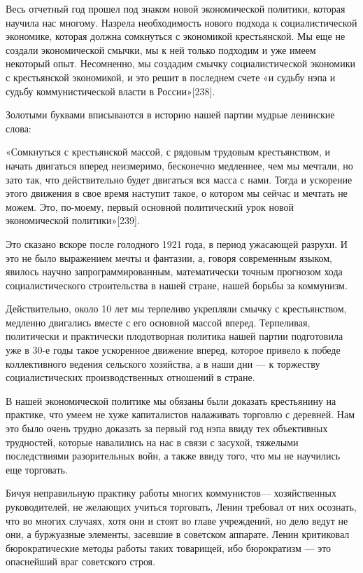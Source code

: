 \documentclass[12pt, a4paper, openany]{book}
\begin{document}
Весь отчетный год прошел под знаком новой экономической политики, которая научила нас многому. Назрела необходимость нового подхода к социалистической экономике, которая должна сомкнуться с экономикой крестьянской. Мы еще не создали экономической смычки, мы к ней только подходим и уже имеем некоторый опыт. Несомненно, мы создадим смычку социалистической экономики с крестьянской экономикой, и это решит в последнем счете «и судьбу нэпа и судьбу коммунистической власти в России»[238].

Золотыми буквами вписываются в историю нашей партии мудрые ленинские слова:

«Сомкнуться с крестьянской массой, с рядовым трудовым крестьянством, и начать двигаться вперед неизмеримо, бесконечно медленнее, чем мы мечтали, но зато так, что действительно будет двигаться вся масса с нами. Тогда и ускорение этого движения в свое время наступит такое, о котором мы сейчас и мечтать не можем. Это, по-моему, первый основной политический урок новой экономической политики»[239].

Это сказано вскоре после голодного 1921 года, в период ужасающей разрухи. И это не было выражением мечты и фантазии, а, говоря современным языком, явилось научно запрограммированным, математически точным прогнозом хода социалистического строительства в нашей стране, нашей борьбы за коммунизм.

Действительно, около 10 лет мы терпеливо укрепляли смычку с крестьянством, медленно двигались вместе с его основной массой вперед. Терпеливая, политически и практически плодотворная политика нашей партии подготовила уже в 30-е годы такое ускоренное движение вперед, которое привело к победе коллективного ведения сельского хозяйства, а в наши дни — к торжеству социалистических производственных отношений в стране.

В нашей экономической политике мы обязаны были доказать крестьянину на практике, что умеем не хуже капиталистов налаживать торговлю с деревней. Нам это было очень трудно доказать за первый год нэпа ввиду тех объективных трудностей, которые навалились на нас в связи с засухой, тяжелыми последствиями разорительных войн, а также ввиду того, что мы не научились еще торговать.

Бичуя неправильную практику работы многих коммунистов— хозяйственных руководителей, не желающих учиться торговать, Ленин требовал от них осознать, что во многих случаях, хотя они и стоят во главе учреждений, но дело ведут не они, а буржуазные элементы, засевшие в советском аппарате. Ленин критиковал бюрократические методы работы таких товарищей, ибо бюрократизм — это опаснейший враг советского строя.
\end{document}

